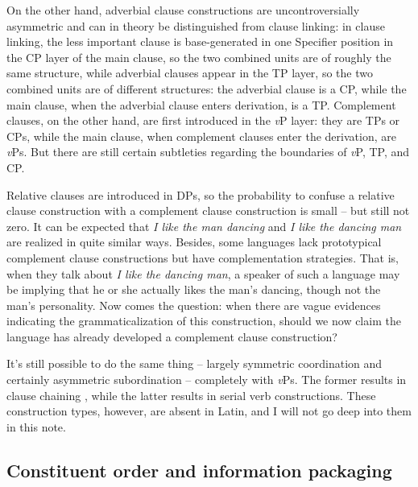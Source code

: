 \documentclass[a4paper, oneside, 12pt]{report}
\newcommand{\form}[1]{\emph{#1}}
\newcommand{\vP}{\textit{v}P}
\begin{document}
{On the other hand, adverbial clause constructions 
are uncontroversially asymmetric and can in theory be distinguished from clause linking:
in clause linking, the less important clause 
is base-generated in one Specifier position in the CP layer of the main clause,
so the two combined units are of roughly the same structure,
while adverbial clauses appear in the TP layer,
so the two combined units are of different structures:
the adverbial clause is a CP,
while the main clause, when the adverbial clause enters derivation,
is a TP.
Complement clauses, on the other hand, are first introduced in the \vP{} layer:
they are TPs or CPs,
while the main clause, when complement clauses enter the derivation,
are \vP s.
But there are still certain subtleties regarding the boundaries of \vP{}, TP, and CP.

Relative clauses are introduced in DPs, 
so the probability to confuse a relative clause construction 
with a complement clause construction is small -- but still not zero.
It can be expected that \form{I like the man dancing} and \form{I like the dancing man} 
are realized in quite similar ways.
Besides, some languages lack prototypical complement clause constructions 
but have complementation strategies.
That is, when they talk about \form{I like the dancing man},
a speaker of such a language may be implying that he or she actually likes the man's dancing,
though not the man's personality.
Now comes the question:
when there are vague evidences indicating the grammaticalization of this construction,
should we now claim the language has already developed a complement clause construction?

It's still possible to do the same thing 
-- largely symmetric coordination and certainly asymmetric subordination -- 
completely with \vP s.
The former results in clause chaining \citep{nonato2014clause},
while the latter results in serial verb constructions.
These construction types, however, are absent in Latin, and I will not go deep into them in this note.

\subsection{Constituent order and information packaging}

}
\end{document}
